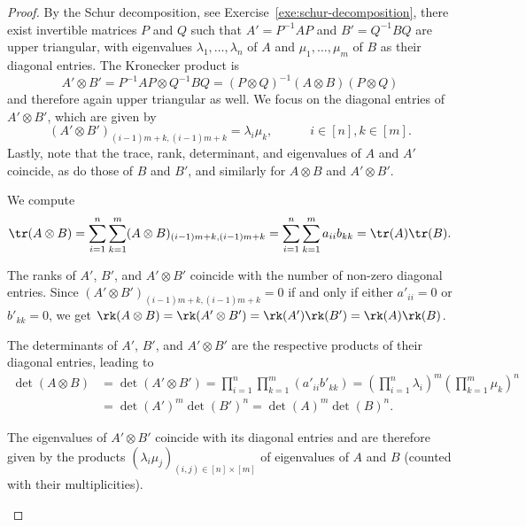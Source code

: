 \documentclass[a4paper,oneside, 12pt]{amsart}
\begin{document}
\begin{proof}
  By the Schur decomposition, see Exercise~\ref{exe:schur-decomposition}, there exist invertible matrices \( P \) and \( Q \) such that \( A' = P^{-1}AP \) and \( B' = Q^{-1}BQ \) are upper triangular, with eigenvalues $ \lambda_1, \dots, \lambda_n $ of $ A $ and $ \mu_1, \dots, \mu_m $ of $ B $ as their diagonal entries.
  The  Kronecker product is
   \begin{equation*}
    A' \otimes B' = P^{-1}AP \otimes Q^{-1}BQ = (P \otimes Q)^{-1}(A \otimes B)(P \otimes Q)
  \end{equation*}
  and therefore again upper triangular as well.
  We focus on the diagonal entries of \(A' \otimes B'\), which are given by
  \begin{equation*}
    (A' \otimes B')_{(i-1)m +k,(i-1)m +k} = \lambda_{i}\mu_{k}, \qquad\quad i \in [n], k\in[m].
  \end{equation*}
  Lastly, note that the trace, rank, determinant, and eigenvalues of \( A \) and \( A' \) coincide, as do those of \( B \) and \( B' \), and similarly for \( A \otimes B \) and \( A' \otimes B' \).
  \begin{thmlist}
    \item We compute
    \begin{equation*}
      \tr(A\otimes B)
      = \sum_{i=1}^{n}\sum_{k=1}^{m}(A \otimes B)_{(i-1)m +k,(i-1)m +k}
      = \sum_{i=1}^{n}\sum_{k=1}^{m} a_{ii}b_{kk}
      = \tr(A) \tr(B).
    \end{equation*}
    \item The ranks of \(A'\), \(B'\), and \(A' \otimes B'\)  coincide with the number of non-zero diagonal entries.
    Since \((A' \otimes B')_{(i-1)m +k,(i-1)m +k} = 0\) if and only if either \(a'_{ii}=0\) or \(b'_{kk}=0\), we get
    \(\rk(A\otimes B) = \rk(A' \otimes B' ) = \rk(A') \rk(B') = \rk(A) \rk(B)\).
    \item The determinants of \(A'\), \(B'\), and \( A' \otimes B' \)  are the respective products of their diagonal entries, leading to
    \begin{align*}
      \det(A\otimes B)
      & = \det(A' \otimes B') = \prod_{i=1}^n \prod_{k=1}^m (a'_{ii} b'_{kk})
        = \left( \prod_{i=1}^n \lambda_{i} \right)^m \left( \prod_{k=1}^m \mu_{k} \right)^n\\
      & = \det(A')^m \det(B')^n
        = \det(A)^m \det(B)^n.
    \end{align*}
    \item The eigenvalues of \( A' \otimes B' \) coincide with its diagonal entries and are therefore given by the products \((\lambda_{i}\mu_{j})_{(i,j)\in [n]\times[m]}\) of eigenvalues of \(A\) and \(B\) (counted with their multiplicities). \qedhere
  \end{thmlist}
\end{proof}
\end{document}
